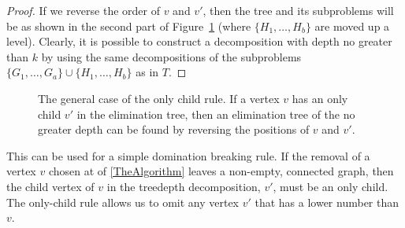 {\begin{proof}
    If we reverse the order of $v$ and $v'$,
    then the tree and its subproblems will be as shown in the second part of Figure~\ref{fig:onlychildgeneral}
    (where $\{H_1, \dots, H_b\}$ are moved up a level).  Clearly, it is possible to construct a decomposition
    with depth no greater than $k$ by using the same decompositions of the
    subproblems $\{G_1, \dots, G_a\} \cup \{H_1, \dots, H_b\}$ as in $T$.
    \end{proof}

    \begin{figure}[htb]
      \centering
    \qquad
      \caption{The general case of the only child rule.  If a vertex
      $v$ has an only child $v'$ in the elimination tree, then an elimination
      tree of the no greater depth can be found by reversing the positions of $v$
      and $v'$.}
      \label{fig:onlychildgeneral}
    \end{figure}

    This can be used for a simple domination breaking rule.  If the removal of a vertex $v$ chosen at
     of \cref{TheAlgorithm} leaves a non-empty, connected graph, then the child
    vertex of $v$ in the treedepth decomposition, $v'$, must be an only child.  The only-child rule
    allows us to omit any vertex $v'$ that has a lower number than $v$.

}
